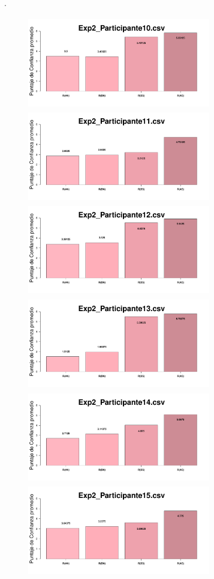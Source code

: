 \documentclass[a4paper ]{article}
\begin{document}
\vfill .
\begin{figure}[th]
\begin{center}
\includegraphics[width=8cm, height=4cm]{Figures/MirrorRating_Exp2_P10} \includegraphics[width=8cm, height=4cm]{Figures/MirrorRating_Exp2_P11} \includegraphics[width=8cm, height=4cm]{Figures/MirrorRating_Exp2_P12}
\includegraphics[width=8cm, height=4cm]{Figures/MirrorRating_Exp2_P13} \includegraphics[width=8cm, height=4cm]{Figures/MirrorRating_Exp2_P14} \includegraphics[width=8cm, height=4cm]{Figures/MirrorRating_Exp2_P15}

\end{center}
\end{figure}
\end{document}
